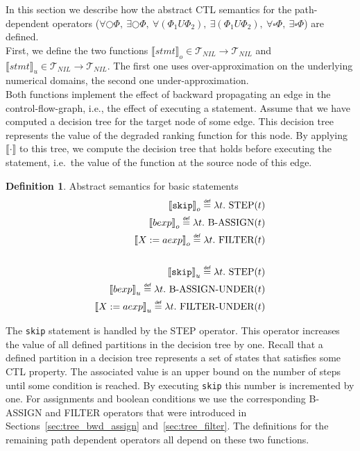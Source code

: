 \documentclass[11pt,a4paper,titlepage]{article}
\theoremstyle{definition}
\newtheorem{definition}{Definition}[section]
\newcommand\eqdef{\mathrel{\overset{\makebox[0pt]{\mbox{\normalfont\tiny\sffamily def}}}{=}}}
\begin{document}
In this section we describe how the abstract CTL semantics for the path-dependent operators 
($\forall\bigcirc\Phi,\ \exists\bigcirc\Phi,\ \forall(\Phi_1 U \Phi_2),\ \exists(\Phi_1 U \Phi_2),\ \forall\square\Phi,\ \exists\square\Phi$)
are defined.\\

First, we define the two functions ${\llbracket stmt \rrbracket}_o \in \mathcal{T}_{NIL} \rightarrow \mathcal{T}_{NIL}$
and ${\llbracket stmt \rrbracket}_u \in \mathcal{T}_{NIL} \rightarrow \mathcal{T}_{NIL}$. 
The first one uses over-approximation on the underlying numerical domains, the second one under-approximation.\\

Both functions implement the effect of backward propagating an edge 
in the control-flow-graph, i.e., the effect of executing a statement. 
Assume that we have computed a decision tree for the target node of some edge. 
This decision tree represents the value of the degraded ranking function for this node. 
By applying ${\llbracket \cdot \rrbracket}$ to this tree, we compute the decision tree 
that holds before executing the statement, i.e.\, the value of the function at the source node of this edge.



\begin{definition}\label{def:basic_expression_transformer}
    Abstract semantics for basic statements
    \begin{align*}
        {\llbracket \mathtt{skip} \rrbracket}_o \eqdef \lambda t. \ \text{STEP}(t)\\
        {\llbracket bexp \rrbracket}_o \eqdef \lambda t. \ \text{B-ASSIGN}(t)\\
        {\llbracket X := aexp \rrbracket}_o \eqdef \lambda t. \ \text{FILTER}(t)\\
        \\
        {\llbracket \mathtt{skip} \rrbracket}_u \eqdef \lambda t. \ \text{STEP}(t)\\
        {\llbracket bexp \rrbracket}_u \eqdef \lambda t. \ \text{B-ASSIGN-UNDER}(t)\\
        {\llbracket X := aexp \rrbracket}_u \eqdef \lambda t. \ \text{FILTER-UNDER}(t)\\
    \end{align*}
\end{definition}

The \texttt{skip} statement is handled by the STEP operator. This operator increases the value of all defined
partitions in the decision tree by one. Recall that a defined partition in a decision tree represents a set of states that satisfies 
some CTL property. The associated value is an upper bound on the number of steps until some condition is reached. 
By executing \texttt{skip} this number is incremented by one.
For assignments and boolean conditions we use the corresponding B-ASSIGN and FILTER 
operators that were introduced in Sections~\ref{sec:tree_bwd_assign} and~\ref{sec:tree_filter}.
The definitions for the remaining path dependent operators all depend on these two functions.
\end{document}
